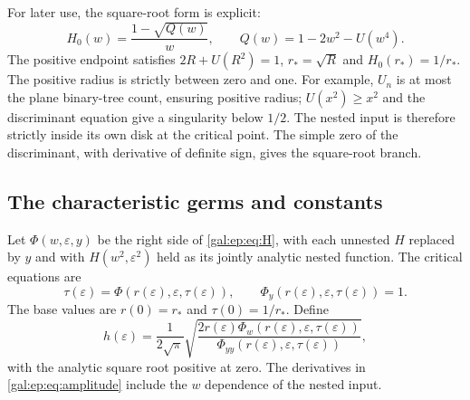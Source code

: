 \documentclass[11pt,letterpaper]{article}
\numberwithin{equation}{section}
\theoremstyle{definition}\newtheorem{definition}[theorem]{Definition}
\theoremstyle{remark}\newtheorem{remark}[theorem]{Remark}
\newcommand{\eps}{\varepsilon}
\begin{document}
For later use, the square-root form is explicit:
\begin{equation}\label{gal:ep:eq:H0sqrt}
H_0(w)=\frac{1-\sqrt{Q(w)}}w,
\qquad Q(w)=1-2w^2-U(w^4).
\end{equation}
The positive endpoint satisfies $2R+U(R^2)=1$, $r_*=\sqrt R$ and $H_0(r_*)=1/r_*$. The positive radius is strictly between zero and one. For example, $U_n$ is at most the plane binary-tree count, ensuring positive radius; $U(x^2)\ge x^2$ and the discriminant equation give a singularity below $1/2$. The nested input is therefore strictly inside its own disk at the critical point. The simple zero of the discriminant, with derivative of definite sign, gives the square-root branch.

\subsection{The characteristic germs and constants}
Let $\Phi(w,\eps,y)$ be the right side of \eqref{gal:ep:eq:H}, with each unnested $H$ replaced by $y$ and with $H(w^2,\eps^2)$ held as its jointly analytic nested function. The critical equations are
\begin{equation}\label{gal:ep:eq:critical}
\tau(\eps)=\Phi(r(\eps),\eps,\tau(\eps)),
\qquad \Phi_y(r(\eps),\eps,\tau(\eps))=1.
\end{equation}
The base values are $r(0)=r_*$ and $\tau(0)=1/r_*$. Define
\begin{equation}\label{gal:ep:eq:amplitude}
h(\eps)=\frac1{2\sqrt\pi}
\sqrt{\frac{2r(\eps)\Phi_w(r(\eps),\eps,\tau(\eps))}
                 {\Phi_{yy}(r(\eps),\eps,\tau(\eps))}},
\end{equation}
with the analytic square root positive at zero. The derivatives in \eqref{gal:ep:eq:amplitude} include the $w$ dependence of the nested input.
\end{document}
